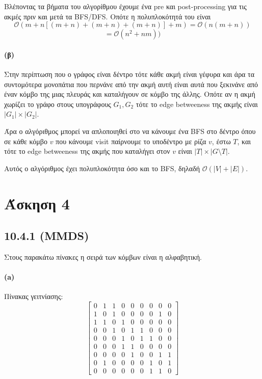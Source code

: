 \documentclass[a4paper,11pt]{article}
\begin{document}
Βλέποντας τα βήματα του αλγορίθμου έχουμε ένα pre και post-processing για τις ακμές πριν και μετά τα BFS/DFS.
Οπότε η πολυπλοκότητά του είναι
\[\mathcal{O}(m + n[(m+n) + (m+n) + (m+n)] + m) = \mathcal{O}(n(m+n))\]
\[= \mathcal{O}(n^2+nm))\]

\paragraph{(β)} Στην περίπτωση που ο γράφος είναι δέντρο τότε κάθε ακμή είναι γέφυρα και άρα τα συντομότερα μονοπάτια που περνάνε από την ακμή αυτή είναι αυτά που ξεκινάνε από έναν κόμβο της μιας πλευράς και καταλήγουν σε κόμβο της άλλης.
Οπότε αν η ακμή χωρίζει το γράφο στους υπογράφους $G_1,G_2$ τότε το edge betweeness της ακμής είναι $|G_1| \times |G_2|$.

Άρα ο αλγόριθμος μπορεί να απλοποιηθεί στο να κάνουμε ένα BFS στο δέντρο όπου σε κάθε κόμβο $v$ που κάνουμε visit παίρνουμε το υποδέντρο με ρίζα $v$, έστω $T$, και τότε το edge betweeness της ακμής που καταλήγει στον $v$ είναι $|T| \times |G \setminus T|$.

Αυτός ο αλγόριθμος έχει πολυπλοκότητα όσο και το BFS, δηλαδή $\mathcal{O}(|V|+|E|)$.


\section*{Άσκηση 4}

\subsection*{10.4.1 (MMDS)}

Στους παρακάτω πίνακες η σειρά των κόμβων είναι η αλφαβητική.

\paragraph{(a)} Πίνακας γειτνίασης:
\[
	\begin{bmatrix}
		0 & 1 & 1 & 0 & 0 & 0 & 0 & 0 & 0 \\
		1 & 0 & 1 & 0 & 0 & 0 & 0 & 1 & 0 \\
		1 & 1 & 0 & 1 & 0 & 0 & 0 & 0 & 0 \\
		0 & 0 & 1 & 0 & 1 & 1 & 0 & 0 & 0 \\
		0 & 0 & 0 & 1 & 0 & 1 & 1 & 0 & 0 \\
		0 & 0 & 0 & 1 & 1 & 0 & 0 & 0 & 0 \\
		0 & 0 & 0 & 0 & 1 & 0 & 0 & 1 & 1 \\
		0 & 1 & 0 & 0 & 0 & 0 & 1 & 0 & 1 \\
		0 & 0 & 0 & 0 & 0 & 0 & 1 & 1 & 0
	\end{bmatrix}
\]
\end{document}
